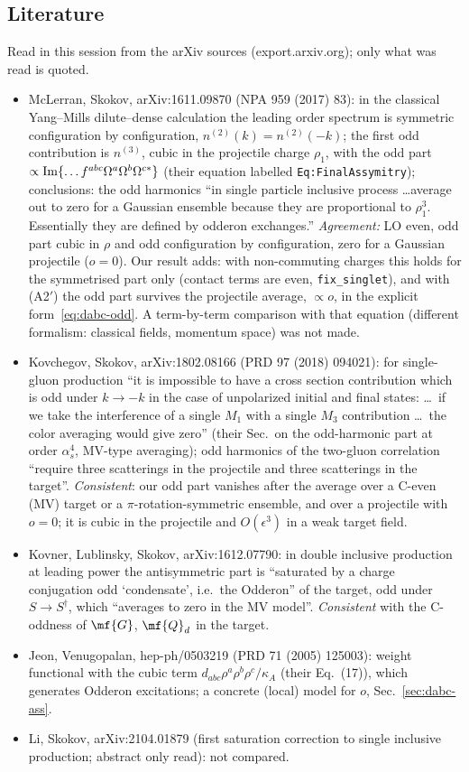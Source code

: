 \subsection{Literature}\label{sec:dabc-lit}
\noindent Read in this session from the arXiv sources (export.arxiv.org); only what was read is quoted.
\begin{itemize}
\item McLerran, Skokov, arXiv:1611.09870 (NPA 959 (2017) 83): in the classical Yang--Mills dilute--dense calculation the leading order spectrum is symmetric configuration by configuration, $n^{(2)}(k)=n^{(2)}(-k)$; the first odd contribution is $n^{(3)}$, cubic in the projectile charge $\rho_{1}$, with the odd part $\propto{\rm Im}\{\dots f^{abc}\Omega^{a}\Omega^{b}\Omega^{c*}\}$ (their equation labelled \texttt{Eq:FinalAssymitry}); conclusions: the odd harmonics ``in single particle inclusive process \dots average out to zero for a Gaussian ensemble because they are proportional to $\rho_{1}^{3}$. Essentially they are defined by odderon exchanges.'' \emph{Agreement:} LO even, odd part cubic in $\rho$ and odd configuration by configuration, zero for a Gaussian projectile ($o=0$). Our result adds: with non-commuting charges this holds for the symmetrised part only (contact terms are even, \texttt{fix\_singlet}), and with (A2$'$) the odd part survives the projectile average, $\propto o$, in the explicit form~\eqref{eq:dabc-odd}. A term-by-term comparison with that equation (different formalism: classical fields, momentum space) was not made.
\item Kovchegov, Skokov, arXiv:1802.08166 (PRD 97 (2018) 094021): for single-gluon production ``it is impossible to have a cross section contribution which is odd under $k\to-k$ in the case of unpolarized initial and final states: \dots\ if we take the interference of a single $M_{1}$ with a single $M_{3}$ contribution \dots\ the color averaging would give zero'' (their Sec.\ on the odd-harmonic part at order $\alpha_{s}^{4}$, MV-type averaging); odd harmonics of the two-gluon correlation ``require three scatterings in the projectile and three scatterings in the target''. \emph{Consistent}: our odd part vanishes after the average over a C-even (MV) target or a $\pi$-rotation-symmetric ensemble, and over a projectile with $o=0$; it is cubic in the projectile and $O(\epsilon^{3})$ in a weak target field.
\item Kovner, Lublinsky, Skokov, arXiv:1612.07790: in double inclusive production at leading power the antisymmetric part is ``saturated by a charge conjugation odd `condensate', i.e.\ the Odderon'' of the target, odd under $S\to S^{\dagger}$, which ``averages to zero in the MV model''. \emph{Consistent} with the C-oddness of $\mf{G}$, $\mf{Q}_{d}$ in the target.
\item Jeon, Venugopalan, hep-ph/0503219 (PRD 71 (2005) 125003): weight functional with the cubic term $d_{abc}\rho^{a}\rho^{b}\rho^{c}/\kappa_{A}$ (their Eq.~(17)), which generates Odderon excitations; a concrete (local) model for $o$, Sec.~\ref{sec:dabc-ass}.
\item Li, Skokov, arXiv:2104.01879 (first saturation correction to single inclusive production; abstract only read): not compared.
\end{itemize}

